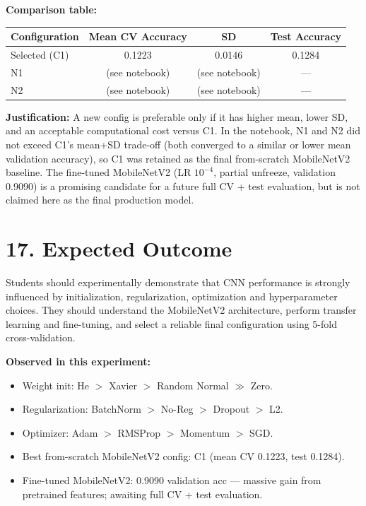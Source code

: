 \documentclass[10pt]{article}
\begin{document}
\textbf{Comparison table:}
\begin{center}
\begin{tabular}{|l|c|c|c|}
\hline
Configuration & Mean CV Accuracy & SD & Test Accuracy\\
\hline
Selected (C1) & 0.1223 & 0.0146 & 0.1284\\
N1            & (see notebook) & (see notebook) & ---\\
N2            & (see notebook) & (see notebook) & ---\\
\hline
\end{tabular}
\end{center}

\textbf{Justification:} A new config is preferable only if it has higher
mean, lower SD, and an acceptable computational cost versus C1. In the
notebook, N1 and N2 did not exceed C1's mean+SD trade-off (both
converged to a similar or lower mean validation accuracy), so C1 was
retained as the final from-scratch MobileNetV2 baseline. The fine-tuned
MobileNetV2 (LR $10^{-4}$, partial unfreeze, validation 0.9090) is a
promising candidate for a future full CV + test evaluation, but is not
claimed here as the final production model.

\section*{17. Expected Outcome}
Students should experimentally demonstrate that CNN performance is
strongly influenced by initialization, regularization, optimization and
hyperparameter choices. They should understand the MobileNetV2 architecture,
perform transfer learning and fine-tuning, and select a reliable final
configuration using 5-fold cross-validation.

\textbf{Observed in this experiment:}
\begin{itemize}
\item Weight init: He $>$ Xavier $>$ Random Normal $\gg$ Zero.
\item Regularization: BatchNorm $>$ No-Reg $>$ Dropout $>$ L2.
\item Optimizer: Adam $>$ RMSProp $>$ Momentum $>$ SGD.
\item Best from-scratch MobileNetV2 config: C1 (mean CV 0.1223, test 0.1284).
\item Fine-tuned MobileNetV2: 0.9090 validation acc --- massive gain from
pretrained features; awaiting full CV + test evaluation.
\end{itemize}
\end{document}
